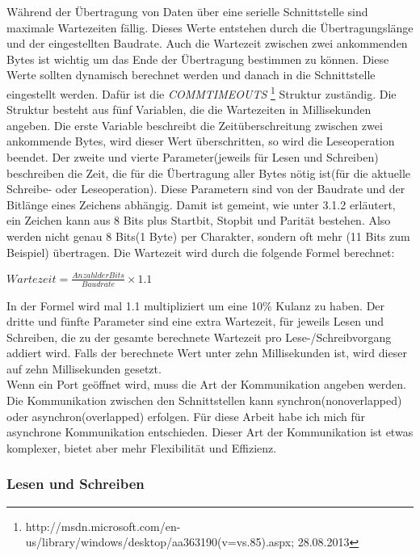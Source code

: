 Während der Übertragung von Daten über eine serielle Schnittstelle sind maximale Wartezeiten fällig. Dieses Werte entstehen durch die Übertragungslänge und der eingestellten Baudrate. Auch die Wartezeit zwischen zwei ankommenden Bytes ist wichtig um das Ende der Übertragung bestimmen zu können. Diese Werte sollten dynamisch berechnet werden und danach in die Schnittstelle eingestellt werden. Dafür ist die \textit{COMMTIMEOUTS} \footnote{http://msdn.microsoft.com/en-us/library/windows/desktop/aa363190(v=vs.85).aspx; 28.08.2013} Struktur zuständig. Die Struktur besteht aus fünf Variablen, die die Wartezeiten in Millisekunden angeben. Die erste Variable beschreibt die Zeitüberschreitung zwischen zwei ankommende Bytes, wird dieser Wert überschritten, so wird die Leseoperation beendet. Der zweite und vierte Parameter(jeweils für Lesen und Schreiben) beschreiben die Zeit, die für die Übertragung aller Bytes nötig ist(für die aktuelle Schreibe- oder Leseoperation). Diese Parametern sind von der Baudrate und der Bitlänge eines Zeichens abhängig. Damit ist gemeint, wie unter 3.1.2 erläutert, ein Zeichen kann aus 8 Bits plus Startbit, Stopbit und Parität bestehen. Also werden nicht genau 8 Bits(1 Byte) per Charakter, sondern oft mehr (11 Bits zum Beispiel) übertragen. Die Wartezeit wird durch die folgende Formel berechnet:

\begin{center}
$ Wartezeit = \frac{Anzahl der Bits}{Baudrate} \times 1.1$
\end{center}

In der Formel wird mal 1.1 multipliziert um eine 10\% Kulanz zu haben. Der dritte und fünfte Parameter sind eine extra Wartezeit, für jeweils Lesen und Schreiben, die zu der gesamte berechnete Wartezeit pro Lese-/Schreibvorgang addiert wird. Falls der berechnete Wert unter zehn Millisekunden ist, wird dieser auf zehn Millisekunden gesetzt.
\\

Wenn ein Port geöffnet wird, muss die Art der Kommunikation angeben werden. Die Kommunikation zwischen den Schnittstellen kann synchron(nonoverlapped) oder asynchron(overlapped) erfolgen. Für diese Arbeit habe ich mich für asynchrone Kommunikation entschieden. Dieser Art der Kommunikation ist etwas komplexer, bietet aber mehr Flexibilität und Effizienz.



\subsubsection{Lesen und Schreiben}
